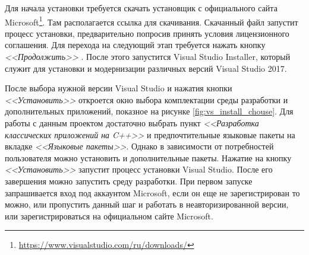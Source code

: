 Для начала установки требуется скачать установщик с официального сайта Microsoft\footnote{\url{https://www.visualstudio.com/ru/downloads/}}. Там располагается ссылка для скачивания. Скачанный файл запустит процесс установки, предварительно попросив принять условия лицензионного соглашения. Для перехода на следующий этап требуется нажать кнопку \textit{<<Продолжить>>} . После этого запустится Visual Studio Installer, который служит для установки и модернизации различных версий Visual Studio 2017.


\begin{comment}
\begin{figure}
    \centering   
    \texttt{[image: vs\_install.JPG]} 
    \caption{Выбор требуемой версии Visual Studio}
    \label{fig:vs_install2}
\end{figure}

\begin{figure}[h]
    \centering
    \begin{subfigure}{0.45\textwidth}  
        \centering     
        \texttt{[image: vs\_download.JPG]}
        \caption{}
        \label{fig:vs_downolad}
    \end{subfigure}
    \begin{subfigure}{0.45\textwidth}  
        \centering
        \texttt{[image: vs\_licence.JPG]}
        \caption{}
        \label{fig:vs_licence}
    \end{subfigure}
    \caption{а -- Ссылка для загрузки установщика; б -- окно принятия лицензионного соглашения}
    \label{fig:vs_install1}
\end{figure}
\end{comment}
После выбора нужной версии Visual Studio и нажатия кнопки \textit{<<Установить>>} откроется окно выбора комплектации среды разработки и дополнительных приложений, показное на рисунке \ref{fig:vs_install_chouse}. Для работы с данным проектом достаточно выбрать пункт \textit{<<Разработка классических приложений на C++>>} и предпочтительные языковые пакеты на вкладке \textit{<<Языковые пакеты>>}. Однако в зависимости от потребностей пользователя можно установить и дополнительные пакеты. Нажатие на кнопку \textit{<<Установить>>} запустит процесс установки Visual Studio.  После его завершения можно запустить среду разработки. При первом запуске запрашивается вход под аккаунтом Microsoft, если он еще не зарегистрирован то можно, или пропустить данный шаг и работать в неавторизированной версии, или зарегистрироваться на официальном сайте Microsoft.

